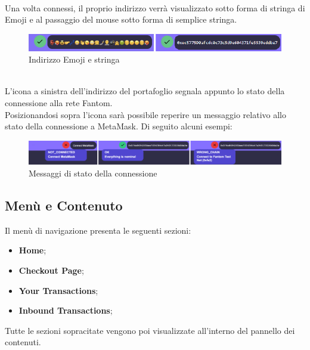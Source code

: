    \textbf{}\\
    Una volta connessi, il proprio indirizzo verrà visualizzato sotto forma di stringa di Emoji e al passaggio del mouse sotto forma di semplice stringa.
    \begin{figure}[H]
        \centering
        \includegraphics[scale=0.7]{immagini/emoji.png}
        \caption{Indirizzo Emoji e stringa}
    \end{figure}
    \textbf{}\\
    L'icona a sinistra dell'indirizzo del portafoglio segnala appunto lo stato della connessione alla rete Fantom\glo{}.\\
    Posizionandosi sopra l'icona sarà possibile reperire un messaggio relativo allo stato della connessione a MetaMask. Di seguito alcuni esempi:
    \begin{figure}[H]
        \centering
        \includegraphics[scale=0.3]{immagini/stateSignal.png}
        \caption{Messaggi di stato della connessione}
    \end{figure}

    \subsection{Menù e Contenuto} \label{subsection:Menu_E_Contenuto}
    Il menù di navigazione presenta le seguenti sezioni:
    \begin{itemize}
        \item \textbf{Home};
        \item \textbf{Checkout Page};
        \item \textbf{Your Transactions};
        \item \textbf{Inbound Transactions};
    \end{itemize}

    Tutte le sezioni sopracitate vengono poi visualizzate all'interno del pannello dei contenuti.

    

